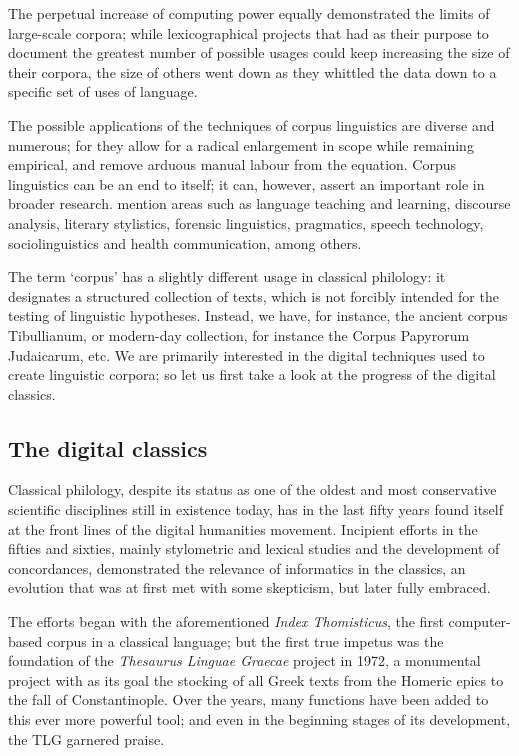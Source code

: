 The perpetual increase of computing power equally demonstrated the
limits of large-scale corpora; while lexicographical projects that had
as their purpose to document the greatest number of possible usages
could keep increasing the size of their corpora, the size of others
went down as they whittled the data down to a specific set of uses of
language.

The possible applications of the techniques of corpus linguistics are
diverse and numerous; for they allow for a radical enlargement in
scope while remaining empirical, and remove arduous manual labour from
the equation.  Corpus linguistics can be an end to itself; it can,
however, assert an important role in broader research.
\cite[7]{okeeffe2010} mention areas such as language teaching and
learning, discourse analysis, literary stylistics, forensic
linguistics, pragmatics, speech technology, sociolinguistics and
health communication, among others.

The term `corpus' has a slightly different usage in classical
philology: it designates a structured collection of texts, which is
not forcibly intended for the testing of linguistic
hypotheses. Instead, we have, for instance, the ancient corpus
Tibullianum, or modern-day collection, for instance the Corpus
Papyrorum Judaicarum, etc. We are primarily interested in the digital
techniques used to create linguistic corpora; so let us first take a
look at the progress of the digital classics.


\subsection{The digital classics}

Classical philology, despite its status as one of the oldest and most
conservative scientific disciplines still in existence today, has in
the last fifty years found itself at the front lines of the digital
humanities movement.  Incipient efforts in the fifties and sixties,
mainly stylometric and lexical studies and the development of
concordances, demonstrated the relevance of informatics in the
classics, an evolution that was at first met with some skepticism, but
later fully embraced.

The efforts began with the aforementioned \textit{Index Thomisticus}, the first
computer-based corpus in a classical language; but the first true
impetus was the foundation of the \textit{Thesaurus Linguae Graecae} project in
1972, a monumental project with as its goal the stocking of all Greek
texts from the Homeric epics to the fall of Constantinople. Over the
years, many functions have been added to this ever more powerful tool;
and even in the beginning stages of its development, the TLG garnered
praise.

